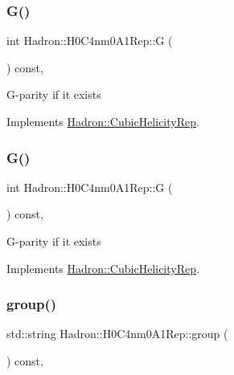 \subsubsection{\texorpdfstring{G()}{G()}\hspace{0.1cm}{\footnotesize\ttfamily [1/2]}}
{\footnotesize\ttfamily int Hadron\+::\+H0\+C4nm0\+A1\+Rep\+::G (\begin{DoxyParamCaption}{ }\end{DoxyParamCaption}) const\hspace{0.3cm}{\ttfamily [inline]}, {\ttfamily [virtual]}}

G-\/parity if it exists 

Implements \mbox{\hyperlink{structHadron_1_1CubicHelicityRep_a50689f42be1e6170aa8cf6ad0597018b}{Hadron\+::\+Cubic\+Helicity\+Rep}}.

\mbox{\label{structHadron_1_1H0C4nm0A1Rep_a51f07119171a1010fe83724438b4e7bc}} 
\subsubsection{\texorpdfstring{G()}{G()}\hspace{0.1cm}{\footnotesize\ttfamily [2/2]}}
{\footnotesize\ttfamily int Hadron\+::\+H0\+C4nm0\+A1\+Rep\+::G (\begin{DoxyParamCaption}{ }\end{DoxyParamCaption}) const\hspace{0.3cm}{\ttfamily [inline]}, {\ttfamily [virtual]}}

G-\/parity if it exists 

Implements \mbox{\hyperlink{structHadron_1_1CubicHelicityRep_a50689f42be1e6170aa8cf6ad0597018b}{Hadron\+::\+Cubic\+Helicity\+Rep}}.

\mbox{\label{structHadron_1_1H0C4nm0A1Rep_a721e8c07bbc6143cad2cf745771be3f9}} 
\subsubsection{\texorpdfstring{group()}{group()}\hspace{0.1cm}{\footnotesize\ttfamily [1/3]}}
{\footnotesize\ttfamily std\+::string Hadron\+::\+H0\+C4nm0\+A1\+Rep\+::group (\begin{DoxyParamCaption}{ }\end{DoxyParamCaption}) const\hspace{0.3cm}{\ttfamily [inline]}, {\ttfamily [virtual]}}

